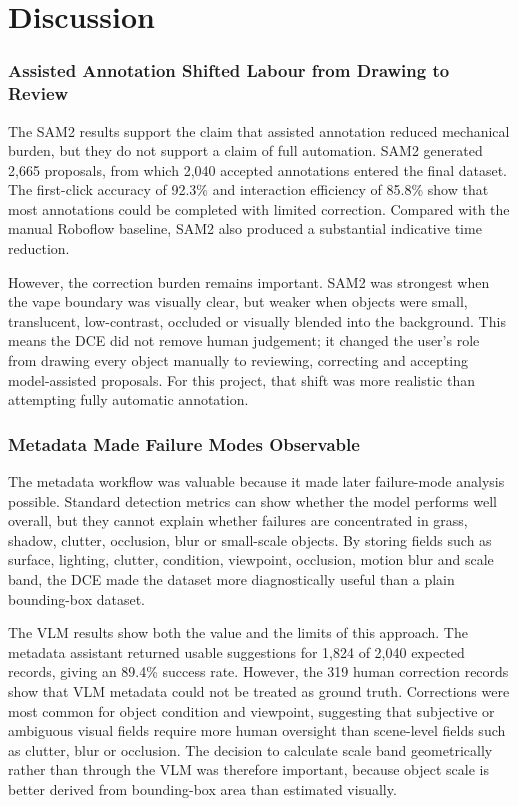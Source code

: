 \section{Discussion}

\subsubsection{Assisted Annotation Shifted Labour from Drawing to Review}

The SAM2 results support the claim that assisted annotation reduced mechanical burden, but they do not support a claim of full automation. SAM2 generated 2,665 proposals, from which 2,040 accepted annotations entered the final dataset. The first-click accuracy of 92.3\% and interaction efficiency of 85.8\% show that most annotations could be completed with limited correction. Compared with the manual Roboflow baseline, SAM2 also produced a substantial indicative time reduction.

However, the correction burden remains important. SAM2 was strongest when the vape boundary was visually clear, but weaker when objects were small, translucent, low-contrast, occluded or visually blended into the background. This means the DCE did not remove human judgement; it changed the user's role from drawing every object manually to reviewing, correcting and accepting model-assisted proposals. For this project, that shift was more realistic than attempting fully automatic annotation.

\subsubsection{Metadata Made Failure Modes Observable}

The metadata workflow was valuable because it made later failure-mode analysis possible. Standard detection metrics can show whether the model performs well overall, but they cannot explain whether failures are concentrated in grass, shadow, clutter, occlusion, blur or small-scale objects. By storing fields such as surface, lighting, clutter, condition, viewpoint, occlusion, motion blur and scale band, the DCE made the dataset more diagnostically useful than a plain bounding-box dataset.

The VLM results show both the value and the limits of this approach. The metadata assistant returned usable suggestions for 1,824 of 2,040 expected records, giving an 89.4\% success rate. However, the 319 human correction records show that VLM metadata could not be treated as ground truth. Corrections were most common for object condition and viewpoint, suggesting that subjective or ambiguous visual fields require more human oversight than scene-level fields such as clutter, blur or occlusion. The decision to calculate scale band geometrically rather than through the VLM was therefore important, because object scale is better derived from bounding-box area than estimated visually.

